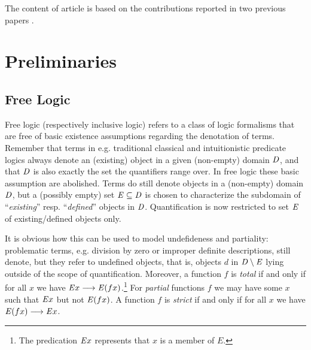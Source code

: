The content of article is based on the 
contributions reported in two previous papers \cite{ICMS,ArXiv}.




\section{Preliminaries}
\label{sec:preliminaries}
\subsection{Free Logic}
Free logic (respectively
inclusive logic) 
\cite{Lambert60,Scott67,lambert02:_free_logic,sep-logic-free} refers to a class of logic
formalisms that are free of basic existence assumptions regarding the
denotation of terms. Remember that terms in e.g. traditional classical
and intuitionistic predicate logics always denote an (existing) object
in a given (non-empty) domain $\mathit{D}$, and that $\mathit{D}$ is also exactly the set the
quantifiers range over. In free logic these
basic assumption are abolished. Terms do still denote objects in a
(non-empty) domain $\mathit{D}$, but a (possibly empty) set $\mathit{E}\subseteq \mathit{D}$ is
chosen to characterize the subdomain of ``\emph{existing}'' resp. ``\emph{defined}''
objects in $\mathit{D}$. Quantification is
now restricted to set $\mathit{E}$ of existing/defined objects only. 


It is obvious how this can be used to model undefideness and
partiality: problematic terms, e.g. division by zero or improper
definite descriptions, still denote, but they refer to undefined
objects, that is, objects $d$ in $\mathit{D}\setminus \mathit{E}$ lying outside of
the scope of quantification.
Moreover, a function $f$ is \emph{total} if and only if for all $x$ we
have $\mathit{E} x \longrightarrow \mathit{E}(f x)$.\footnote{The predication $\mathit{E} x$ represents that $x$ is a
  member of $E$.}
For \emph{partial} functions $f$ we may have some $x$ such that $\mathit{E} x$ but not
$\mathit{E}(f x)$. A function $f$ is \emph{strict}  if  and only if for all $x$
 we have $\mathit{E}(f x) \longrightarrow \mathit{E} x$.


